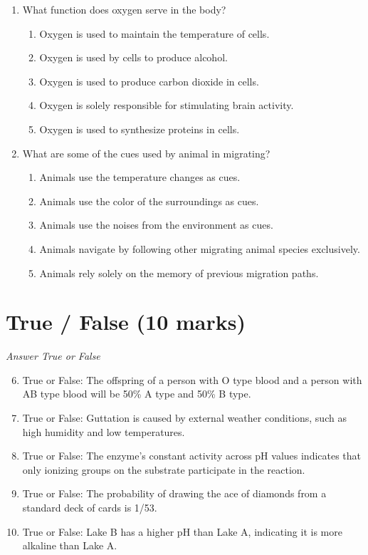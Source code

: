 \documentclass[12pt]{article}
\begin{document}
\begin{enumerate}[label=\arabic*.]
\begin{enumerate}[label=(\alph*)]
\end{enumerate}
\item What function does oxygen serve in the body?
\begin{enumerate}[label=(\alph*)]
    \item Oxygen is used to maintain the temperature of cells.
    \item Oxygen is used by cells to produce alcohol.
    \item Oxygen is used to produce carbon dioxide in cells.
    \item Oxygen is solely responsible for stimulating brain activity.
    \item Oxygen is used to synthesize proteins in cells.
\end{enumerate}
\item What are some of the cues used by animal in migrating?
\begin{enumerate}[label=(\alph*)]
    \item Animals use the temperature changes as cues.
    \item Animals use the color of the surroundings as cues.
    \item Animals use the noises from the environment as cues.
    \item Animals navigate by following other migrating animal species exclusively.
    \item Animals rely solely on the memory of previous migration paths.
\end{enumerate}
\end{enumerate}

\section*{True / False (10 marks)}
\textit{Answer True or False}
\begin{enumerate}[label=\arabic*.]
\setcounter{enumi}{5}
\item True or False: The offspring of a person with O type blood and a person with AB type blood will be 50\% A type and 50\% B type.
\item True or False: Guttation is caused by external weather conditions, such as high humidity and low temperatures.
\item True or False: The enzyme's constant activity across pH values indicates that only ionizing groups on the substrate participate in the reaction.
\item True or False: The probability of drawing the ace of diamonds from a standard deck of cards is 1/53.
\item True or False: Lake B has a higher pH than Lake A, indicating it is more alkaline than Lake A.
\end{enumerate}
\end{document}
